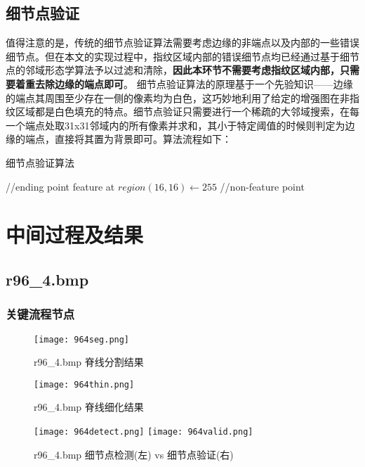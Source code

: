 \documentclass[UTF8]{ctexart}
\begin{document}
\subsection{细节点验证}
值得注意的是，传统的细节点验证算法需要考虑边缘的非端点以及内部的一些错误细节点。但在本文的实现过程中，指纹区域内部的错误细节点均已经通过基于细节点的邻域形态学算法予以过滤和清除，\textbf{因此本环节不需要考虑指纹区域内部，只需要着重去除边缘的端点即可}。
细节点验证算法的原理基于一个先验知识——边缘的端点其周围至少存在一侧的像素均为白色，这巧妙地利用了给定的增强图在非指纹区域都是白色填充的特点。细节点验证只需要进行一个稀疏的大邻域搜索，在每一个端点处取31x31邻域内的所有像素并求和，其小于特定阈值的时候则判定为边缘的端点，直接将其置为背景即可。算法流程如下：

\begin{algorithm}[H]
    \caption{细节点验证算法}
    {
         //ending point
        {
            {
                feature at $region(16,16) \leftarrow 255$ //non-feature point
            }
        }
    }
\end{algorithm}


\section{中间过程及结果}

\subsection{r96\_4.bmp}

\subsubsection{关键流程节点}
\begin{figure}[H]
    \centering
    \texttt{[image: 964seg.png]}
    \caption{r96\_4.bmp 脊线分割结果}
\end{figure}

\begin{figure}[H]
    \centering
    \texttt{[image: 964thin.png]}
    \caption{r96\_4.bmp 脊线细化结果}
\end{figure}

\begin{figure}[H]
    \centering
    \texttt{[image: 964detect.png]}
    \texttt{[image: 964valid.png]}
    \caption{r96\_4.bmp 细节点检测(左) vs 细节点验证(右)}
\end{figure}
\end{document}
